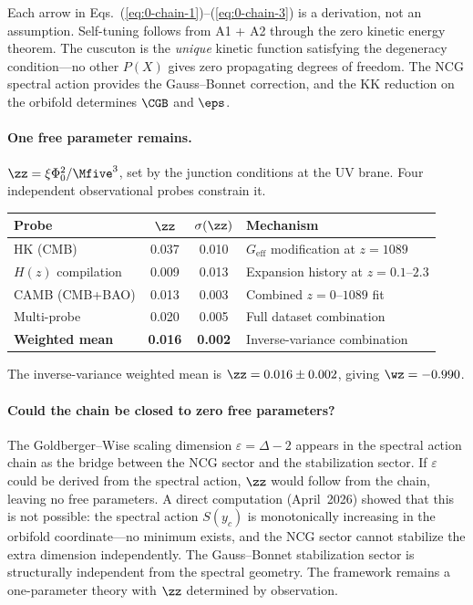 Each arrow in Eqs.~(\ref{eq:0-chain-1})--(\ref{eq:0-chain-3}) is a
derivation, not an assumption. Self-tuning follows from A1 + A2 through
the zero kinetic energy theorem. The cuscuton is the \emph{unique}
kinetic function satisfying the degeneracy condition---no other $P(X)$
gives zero propagating degrees of freedom. The NCG spectral action
provides the Gauss--Bonnet correction, and the KK reduction on the
orbifold determines $\CGB$ and $\eps$.

\paragraph{One free parameter remains.}
$\zz = \xi \Phi_0^2 / \Mfive^3$, set by the junction conditions at the
UV brane. Four independent observational probes constrain it.

\begin{center}
\small
\begin{tabular}{@{}l c c l@{}}
\toprule
\textbf{Probe} & $\zz$ & $\sigma(\zz)$ & \textbf{Mechanism} \\
\midrule
HK (CMB)          & 0.037 & 0.010 & $G_{\mathrm{eff}}$ modification at $z = 1089$ \\
$H(z)$ compilation& 0.009 & 0.013 & Expansion history at $z = 0.1$--$2.3$ \\
CAMB (CMB+BAO)    & 0.013 & 0.003 & Combined $z = 0$--$1089$ fit \\
Multi-probe       & 0.020 & 0.005 & Full dataset combination \\
\midrule
\textbf{Weighted mean} & \textbf{0.016} & \textbf{0.002} &
Inverse-variance combination \\
\bottomrule
\end{tabular}
\end{center}

\noindent
The inverse-variance weighted mean is $\zz = 0.016 \pm 0.002$, giving
$\wz = -0.990$.

\paragraph{Could the chain be closed to zero free parameters?}
The Goldberger--Wise scaling dimension $\varepsilon = \Delta - 2$
appears in the spectral action chain as the bridge between the NCG
sector and the stabilization sector. If $\varepsilon$ could be derived
from the spectral action, $\zz$ would follow from the chain, leaving
no free parameters. A direct computation (April~2026) showed that this
is not possible: the spectral action $S(y_c)$ is monotonically
increasing in the orbifold coordinate---no minimum exists, and the NCG
sector cannot stabilize the extra dimension independently. The
Gauss--Bonnet stabilization sector is structurally independent from
the spectral geometry. The framework remains a one-parameter theory
with $\zz$ determined by observation.

